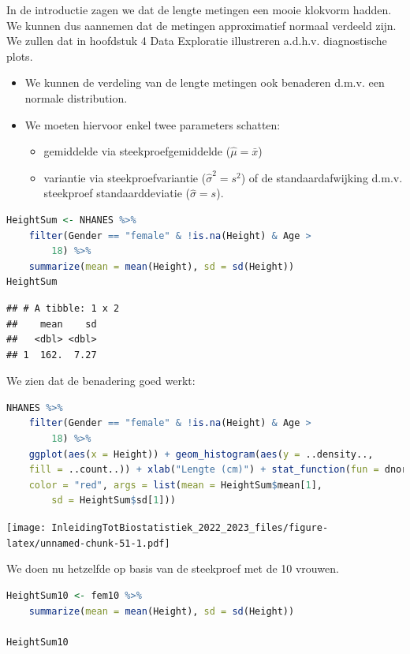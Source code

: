 \documentclass[
  12pt,dutch,coursenotes]{book}
\providecommand{\tightlist}{%
  \setlength{\itemsep}{0pt}\setlength{\parskip}{0pt}}
\begin{document}
In de introductie zagen we dat de lengte metingen een mooie klokvorm hadden. We kunnen dus aannemen dat de metingen approximatief normaal verdeeld zijn. We zullen dat in hoofdstuk 4 Data Exploratie illustreren a.d.h.v. diagnostische plots.

\begin{itemize}
\item
  We kunnen de verdeling van de lengte metingen ook benaderen d.m.v. een normale distribution.
\item
  We moeten hiervoor enkel twee parameters schatten:

  \begin{itemize}
  \tightlist
  \item
    gemiddelde via steekproefgemiddelde (\(\hat\mu=\bar x\))
  \item
    variantie via steekproefvariantie (\(\hat{\sigma}^2= s^2\)) of de standaardafwijking d.m.v. steekproef standaarddeviatie (\(\hat\sigma=s\)).
  \end{itemize}
\end{itemize}

\begin{lstlisting}[language=R]
HeightSum <- NHANES %>%
    filter(Gender == "female" & !is.na(Height) & Age >
        18) %>%
    summarize(mean = mean(Height), sd = sd(Height))
HeightSum
\end{lstlisting}

\begin{lstlisting}
## # A tibble: 1 x 2
##    mean    sd
##   <dbl> <dbl>
## 1  162.  7.27
\end{lstlisting}

We zien dat de benadering goed werkt:

\begin{lstlisting}[language=R]
NHANES %>%
    filter(Gender == "female" & !is.na(Height) & Age >
        18) %>%
    ggplot(aes(x = Height)) + geom_histogram(aes(y = ..density..,
    fill = ..count..)) + xlab("Lengte (cm)") + stat_function(fun = dnorm,
    color = "red", args = list(mean = HeightSum$mean[1],
        sd = HeightSum$sd[1]))
\end{lstlisting}

\texttt{[image: InleidingTotBiostatistiek\_2022\_2023\_files/figure-latex/unnamed-chunk-51-1.pdf]}

We doen nu hetzelfde op basis van de steekproef met de 10 vrouwen.

\begin{lstlisting}[language=R]
HeightSum10 <- fem10 %>%
    summarize(mean = mean(Height), sd = sd(Height))

HeightSum10
\end{lstlisting}
\end{document}
